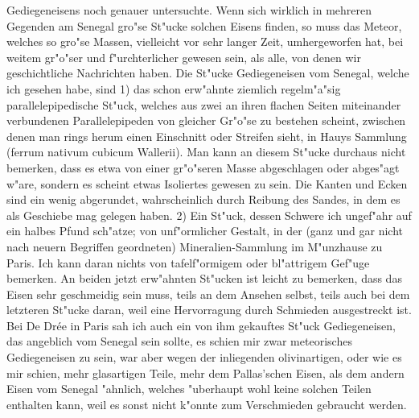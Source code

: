 \documentclass[a4paper, 11pt, oneside, polutonikogreek, german]{article}
\begin{document}
Gediegeneisens noch genauer untersuchte. Wenn sich wirklich in mehreren Gegenden am Senegal gro"se St"ucke solchen Eisens finden, so muss das Meteor, welches so gro"se Massen, vielleicht vor sehr langer Zeit, umhergeworfen hat, bei weitem gr"o"ser und f"urchterlicher gewesen sein, als alle, von denen wir geschichtliche Nachrichten haben. Die St"ucke Gediegeneisen vom Senegal, welche ich gesehen habe, sind 1) das schon erw"ahnte ziemlich regelm"a"sig parallelepipedische St"uck, welches aus zwei an ihren flachen Seiten miteinander verbundenen Parallelepipeden von gleicher Gr"o"se zu bestehen scheint, zwischen denen man rings herum einen Einschnitt oder Streifen sieht, in Hauys Sammlung (ferrum nativum cubicum Wallerii). Man kann an diesem St"ucke durchaus nicht bemerken, dass es etwa von einer gr"o"seren Masse abgeschlagen oder abges"agt w"are, sondern es scheint etwas Isoliertes gewesen zu sein. Die Kanten und Ecken sind ein wenig abgerundet, wahrscheinlich durch Reibung des Sandes, in dem es als Geschiebe mag gelegen haben. 2) Ein St"uck, dessen Schwere ich ungef"ahr auf ein halbes Pfund sch"atze; von unf"ormlicher Gestalt, in der (ganz und gar nicht nach neuern Begriffen geordneten) Mineralien-Sammlung im M"unzhause zu Paris. Ich kann daran nichts von tafelf"ormigem oder bl"attrigem Gef"uge bemerken. An beiden jetzt erw"ahnten St"ucken ist leicht zu bemerken, dass das Eisen sehr geschmeidig sein muss, teils an dem Ansehen selbst, teils auch bei dem letzteren St"ucke daran, weil eine Hervorragung durch Schmieden ausgestreckt ist. Bei De Drée in Paris sah ich auch ein von ihm gekauftes St"uck Gediegeneisen, das angeblich vom Senegal sein sollte, es schien mir zwar meteorisches Gediegeneisen zu sein, war aber wegen der inliegenden olivinartigen, oder wie es mir schien, mehr glasartigen Teile, mehr dem Pallas'schen Eisen, als dem andern Eisen vom Senegal "ahnlich, welches "uberhaupt wohl keine solchen Teilen enthalten kann, weil es sonst nicht k"onnte zum Verschmieden gebraucht werden.
\end{document}
